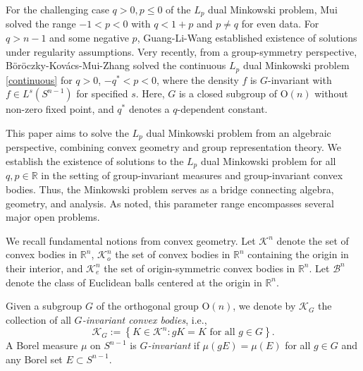 \documentclass[12pt, reqno]{amsart}
\theoremstyle{definition}
\theoremstyle{remark}
\numberwithin{equation}{section}
\newcommand{\Sn}{S^{n-1}}
\newcommand{\On}{\mathrm{O}(n)}
\newcommand{\Lp}{L_{p}}
\begin{document}
	 
	  
	  
	  
	  For the  challenging case  $q>0, p\le 0$  of the $\Lp$ dual Minkowski problem,   Mui \cite{mui2024} solved the range $-1 < p < 0$ with $q < 1 + p$ and $p \neq q$ for even data. For $q>n-1$ and some negative $p$, Guang-Li-Wang \cite{GLW2023 flow} established existence of solutions under regularity assumptions.  Very recently, from a group-symmetry perspective, B\"or\"oczky-Kov\'{a}cs-Mui-Zhang \cite{BKMZ group} solved the continuous $\Lp$ dual Minkowski problem \eqref{continuous} for $q>0$, $-q^{*}<p<0$, where the density $f$ is $G$-invariant  with $f\in L^{s}(\Sn) $ for specified $s$. Here, $G$ is a closed subgroup of $\On$ without non-zero fixed point, and $q^*$ denotes a $q$-dependent constant.
	  
	
	  	This paper aims to solve the $\Lp$ dual Minkowski problem  from an algebraic perspective, combining convex geometry and group representation theory.  We establish the existence of solutions to the $L_p$ dual Minkowski problem for all $q ,p \in \mathbb{R}$  in the setting of
	  	 group-invariant measures and  group-invariant convex bodies.   Thus, the Minkowski problem serves as a bridge connecting algebra, geometry, and analysis.
	  	As noted, this parameter range encompasses several  major open problems.  
	 
	  
We recall fundamental notions from convex geometry.	    Let $\mathcal{K}^n$ denote the set of convex bodies in $\mathbb{R}^n$, 
	    $\mathcal{K}_o^n$ the set of convex bodies in $\mathbb{R}^n$ containing the origin in their interior, 
	    and $\mathcal{K}_e^n$ the set of origin-symmetric convex bodies in $\mathbb{R}^n$. 
	    Let $\mathcal{B}^n$ denote the class of Euclidean balls centered at the origin in $\mathbb{R}^n$. 
	    
	    
	    
	    
	    	Given a subgroup $G$ of the orthogonal group $\On$,
	    we denote by $\mathcal{K}_{G}$ the collection of all \textit{$G$-invariant convex bodies}, i.e.,
	    \begin{equation*}
	    	\mathcal{K}_{G} := \left\{ K \in \mathcal{K}^n : gK = K \text{ for all } g \in G \right\}.
	    \end{equation*}
	   A Borel measure $\mu$ on $S^{n-1}$ is \textit{$G$-invariant} if $
	   \mu(gE) = \mu(E)$ for all $g \in G$ and any Borel set  $E \subset S^{n-1}$.
	  
\end{document}

